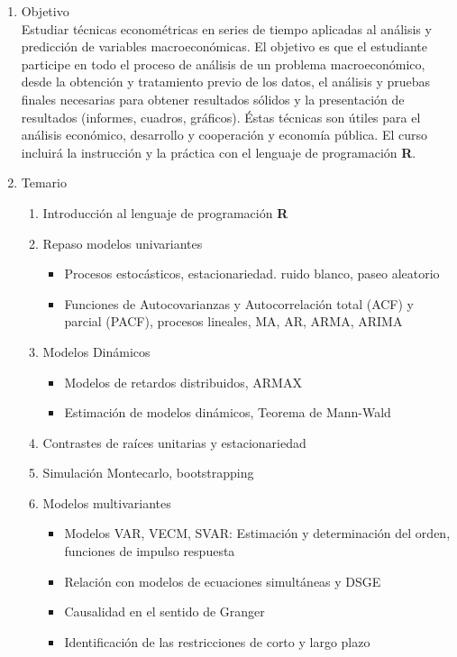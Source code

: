 \documentclass{article}\usepackage[]{graphicx}\usepackage[]{color}
\begin{document}
\begin{enumerate}
  \item Objetivo\\
  Estudiar técnicas econométricas en series de tiempo aplicadas al análisis y predicción de variables macroeconómicas. El objetivo es que el estudiante participe en todo el proceso de análisis de un problema macroeconómico, desde la obtención y tratamiento previo de los datos, el análisis y pruebas finales necesarias para obtener resultados sólidos y la presentación de resultados (informes, cuadros, gráficos). Éstas técnicas son útiles para el análisis económico, desarrollo y cooperación y economía pública. El curso incluirá la instrucción y la práctica con el lenguaje de programación \textbf{\textsf{R}}.

  \item Temario
    \begin{enumerate}
      \item Introducción al lenguaje de programación \textbf{\textsf{R}}
      \item Repaso modelos univariantes
        \begin{itemize}
          \item Procesos estocásticos, estacionariedad. ruido blanco, paseo aleatorio
          \item Funciones de Autocovarianzas y Autocorrelación total (ACF) y parcial (PACF), procesos lineales, MA, AR, ARMA, ARIMA
        \end{itemize}
      \item Modelos Dinámicos
        \begin{itemize}
          \item Modelos de retardos distribuidos, ARMAX
          \item Estimación de modelos dinámicos, Teorema de Mann-Wald
        \end{itemize}
      \item Contrastes de raíces unitarias y estacionariedad
      \item Simulación Montecarlo, bootstrapping
      \item Modelos multivariantes
        \begin{itemize}
          \item Modelos VAR, VECM, SVAR: Estimación y determinación del orden, funciones de impulso respuesta
          \item Relación con modelos de ecuaciones simultáneas y DSGE
          \item Causalidad en el sentido de Granger
          \item Identificación de las restricciones de corto y largo plazo
        \end{itemize}
  \end{enumerate}
  

\end{enumerate}
\end{document}
